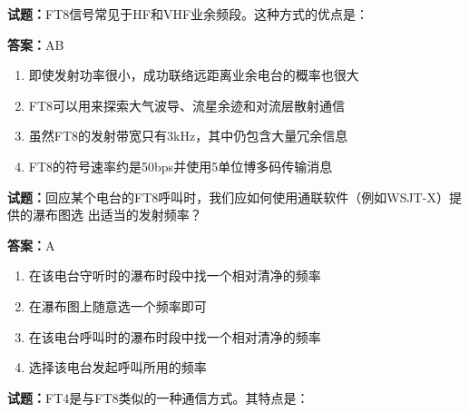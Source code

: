 \documentclass{ctexbook}
\begin{document}




\vspace{1em}

\textbf{试题：}FT8信号常见于HF和VHF业余频段。这种方式的优点是： 

\textbf{答案：}AB 

\begin{enumerate}[leftmargin=3em]
  \item 即使发射功率很小，成功联络远距离业余电台的概率也很大 

  \item FT8可以用来探索大气波导、流星余迹和对流层散射通信 

  \item 虽然FT8的发射带宽只有3kHz，其中仍包含大量冗余信息 

  \item FT8的符号速率约是50bps并使用5单位博多码传输消息 

\end{enumerate}





\vspace{1em}

\textbf{试题：}回应某个电台的FT8呼叫时，我们应如何使用通联软件（例如WSJT-X）提供的瀑布图选
出适当的发射频率？ 

\textbf{答案：}A 

\begin{enumerate}[leftmargin=3em]
  \item 在该电台守听时的瀑布时段中找一个相对清净的频率 

  \item 在瀑布图上随意选一个频率即可 


  \item 在该电台呼叫时的瀑布时段中找一个相对清净的频率 

  \item 选择该电台发起呼叫所用的频率 

\end{enumerate}





\vspace{1em}

\textbf{试题：}FT4是与FT8类似的一种通信方式。其特点是： 
\end{document}
